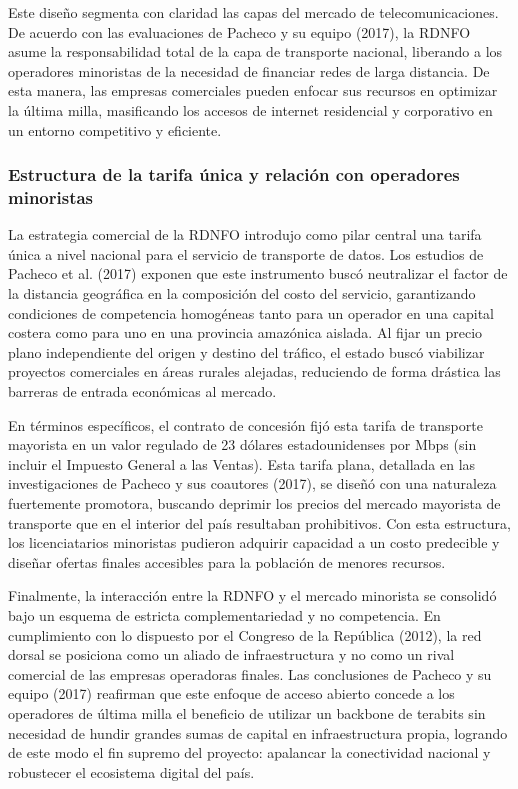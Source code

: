 Este diseño segmenta con claridad las capas del mercado de telecomunicaciones. De acuerdo con las evaluaciones de Pacheco y su equipo (2017), la RDNFO asume la responsabilidad total de la capa de transporte nacional, liberando a los operadores minoristas de la necesidad de financiar redes de larga distancia. De esta manera, las empresas comerciales pueden enfocar sus recursos en optimizar la última milla, masificando los accesos de internet residencial y corporativo en un entorno competitivo y eficiente.
\subsubsection{Estructura de la tarifa única y relación con operadores minoristas}
La estrategia comercial de la RDNFO introdujo como pilar central una tarifa única a nivel nacional para el servicio de transporte de datos. Los estudios de Pacheco et al. (2017) exponen que este instrumento buscó neutralizar el factor de la distancia geográfica en la composición del costo del servicio, garantizando condiciones de competencia homogéneas tanto para un operador en una capital costera como para uno en una provincia amazónica aislada. Al fijar un precio plano independiente del origen y destino del tráfico, el estado buscó viabilizar proyectos comerciales en áreas rurales alejadas, reduciendo de forma drástica las barreras de entrada económicas al mercado.

En términos específicos, el contrato de concesión fijó esta tarifa de transporte mayorista en un valor regulado de 23 dólares estadounidenses por Mbps (sin incluir el Impuesto General a las Ventas). Esta tarifa plana, detallada en las investigaciones de Pacheco y sus coautores (2017), se diseñó con una naturaleza fuertemente promotora, buscando deprimir los precios del mercado mayorista de transporte que en el interior del país resultaban prohibitivos. Con esta estructura, los licenciatarios minoristas pudieron adquirir capacidad a un costo predecible y diseñar ofertas finales accesibles para la población de menores recursos.

Finalmente, la interacción entre la RDNFO y el mercado minorista se consolidó bajo un esquema de estricta complementariedad y no competencia. En cumplimiento con lo dispuesto por el Congreso de la República (2012), la red dorsal se posiciona como un aliado de infraestructura y no como un rival comercial de las empresas operadoras finales. Las conclusiones de Pacheco y su equipo (2017) reafirman que este enfoque de acceso abierto concede a los operadores de última milla el beneficio de utilizar un backbone de terabits sin necesidad de hundir grandes sumas de capital en infraestructura propia, logrando de este modo el fin supremo del proyecto: apalancar la conectividad nacional y robustecer el ecosistema digital del país.
